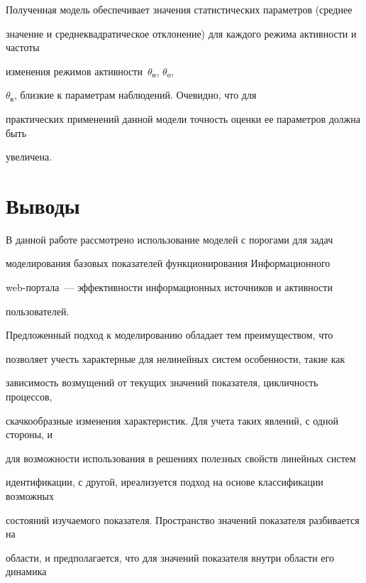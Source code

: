       


      Полученная модель обеспечивает значения статистических параметров (среднее 


значение и среднеквадратическое отклонение) для каждого режима активности и частоты 


изменения режимов активности~$\theta_{\mathrm{н}}$, $\theta_{\mathrm{о}}$, 


$\theta_{\mathrm{в}}$, близкие к параметрам наблюдений. Очевидно, что для 


практических применений данной модели точность оценки ее параметров должна быть 


увеличена.





\section{Выводы}





      В данной работе рассмотрено использование моделей с порогами для задач 


моделирования базовых показателей функционирования Информационного 


      web-пор\-та\-ла~--- эффективности информационных источников и активности 


пользователей. 


      


      Предложенный подход к моделированию обладает тем преимуществом, что 


позволяет учесть характерные для нелинейных систем особенности, такие как 


зависимость возмущений от текущих значений показателя, цикличность процессов, 


скачкообразные изменения характеристик. Для учета таких явлений, с одной стороны, и 


для возможности использования в решениях полезных свойств линейных систем 


идентификации, с другой, и\linebreak реализуется подход на основе классификации возможных 


состо\-яний изучаемого показателя. Пространство значений показателя разбивается на 


области, и предполагается, что для значений показателя внутри области его динамика 


